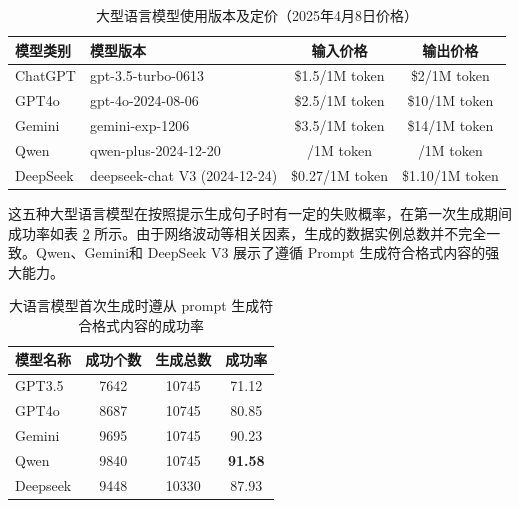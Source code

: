 \begin{table}[htbp]
\centering
\caption{大型语言模型使用版本及定价（2025年4月8日价格）} \label{tab:TOSWT-llmcost}
\begin{tabular}{llcc}
\toprule
\textbf{模型类别} & \textbf{模型版本}                 & \textbf{输入价格}  & \textbf{输出价格}  \\ \midrule
ChatGPT \cite{chatgpt}       & gpt-3.5-turbo-0613            & \$1.5/1M token  & \$2/1M token    \\
GPT4o \cite{gpt4o}         & gpt-4o-2024-08-06             & \$2.5/1M token  & \$10/1M token   \\
Gemini \cite{geminiteam2024geminifamilyhighlycapable}        & gemini-exp-1206               & \$3.5/1M token  & \$14/1M token   \\
Qwen \cite{qwen2025qwen25technicalreport}          & qwen-plus-2024-12-20          & \textyen 0.8/1M token  & \textyen 2/1M token    \\
DeepSeek \cite{deepseekai2024deepseekv3technicalreport}      & deepseek-chat V3 (2024-12-24) & \$0.27/1M token & \$1.10/1M token \\ \bottomrule
\end{tabular}
\end{table}

这五种大型语言模型在按照提示生成句子时有一定的失败概率，在第一次生成期间成功率如表 \ref {tab:construct-dataset-success-rate} 所示。由于网络波动等相关因素，生成的数据实例总数并不完全一致。Qwen、Gemini和 DeepSeek V3 展示了遵循 Prompt 生成符合格式内容的强大能力。

\begin{table}[htbp]
    \centering
    \caption{大语言模型首次生成时遵从 prompt 生成符合格式内容的成功率}
    \begin{tabular}{l|ccc}
\toprule
\textbf{模型名称} & \textbf{成功个数} & \textbf{生成总数} & \textbf{成功率} \\
\midrule
GPT3.5 \cite{chatgpt}   & 7642      & 10745   & 71.12 \\
GPT4o \cite{gpt4o}   & 8687      & 10745   & 80.85 \\
Gemini \cite{geminiteam2024geminifamilyhighlycapable}  & 9695      & 10745   & 90.23 \\
Qwen \cite{qwen2025qwen25technicalreport}    & 9840      & 10745   & \textbf{91.58} \\
Deepseek \cite{deepseekai2024deepseekv3technicalreport} & 9448      & 10330   & 87.93 \\
\bottomrule
    \end{tabular}
    \label{tab:construct-dataset-success-rate}
\end{table}

